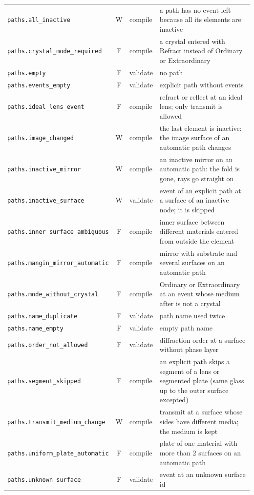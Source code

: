 \documentclass[11pt,a4paper,openany]{book}
\begin{document}
{\begin{longtable}{@{}L{6.1cm}cL{1.3cm}L{6.9cm}@{}}
\texttt{paths.all\_inactive} & W & compile & a path has no event left because all its elements are inactive \\
\texttt{paths.crystal\_mode\_required} & F & compile & a crystal entered with Refract instead of Ordinary or Extraordinary \\
\texttt{paths.empty} & F & validate & no path \\
\texttt{paths.events\_empty} & F & validate & explicit path without events \\
\texttt{paths.ideal\_lens\_event} & F & compile & refract or reflect at an ideal lens; only transmit is allowed \\
\texttt{paths.image\_changed} & W & compile & the last element is inactive: the image surface of an automatic path changes \\
\texttt{paths.inactive\_mirror} & W & compile & an inactive mirror on an automatic path: the fold is gone, rays go straight on \\
\texttt{paths.inactive\_surface} & W & validate & event of an explicit path at a surface of an inactive node; it is skipped \\
\texttt{paths.inner\_surface\_ambiguous} & F & compile & inner surface between different materials entered from outside the element \\
\texttt{paths.mangin\_mirror\_automatic} & F & compile & mirror with substrate and several surfaces on an automatic path \\
\texttt{paths.mode\_without\_crystal} & F & compile & Ordinary or Extraordinary at an event whose medium after is not a crystal \\
\texttt{paths.name\_duplicate} & F & validate & path name used twice \\
\texttt{paths.name\_empty} & F & validate & empty path name \\
\texttt{paths.order\_not\_allowed} & F & validate & diffraction order at a surface without phase layer \\
\texttt{paths.segment\_skipped} & F & compile & an explicit path skips a segment of a lens or segmented plate (same glass up to the outer surface excepted) \\
\texttt{paths.transmit\_medium\_change} & W & compile & transmit at a surface whose sides have different media; the medium is kept \\
\texttt{paths.uniform\_plate\_automatic} & F & compile & plate of one material with more than 2 surfaces on an automatic path \\
\texttt{paths.unknown\_surface} & F & validate & event at an unknown surface id \\

\end{longtable}}
\end{document}
